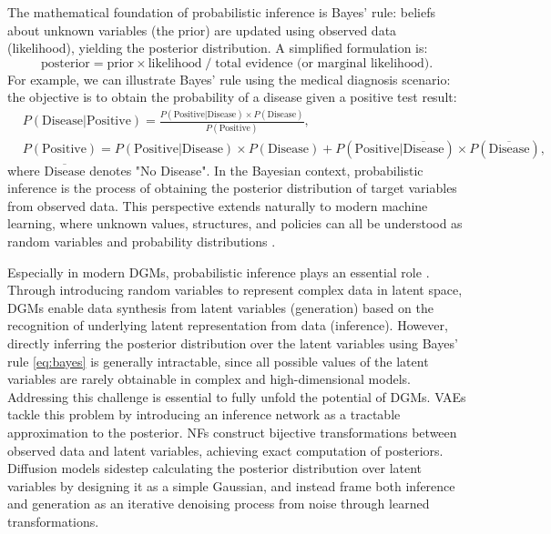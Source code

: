 The mathematical foundation of probabilistic inference is Bayes' rule: beliefs about unknown variables (the prior) are updated using observed data (likelihood), yielding the posterior distribution. A simplified formulation is:
\begin{equation*}
    \label{eq:bayes_sim}
    \text{posterior} = \text{prior}\times \text{likelihood} \;/\; \text{total evidence (or marginal likelihood)}.
\end{equation*}
For example, we can illustrate Bayes' rule using the medical diagnosis scenario: the objective is to obtain the probability of a disease given a positive test result:
\begin{align*}
& P(\text{Disease} | \text{Positive}) = \frac{P(\text{Positive} | \text{Disease}) \times P(\text{Disease})}{P(\text{Positive})},\\
& P(\text{Positive}) = P(\text{Positive} | \text{Disease}) \times P(\text{Disease}) + P(\text{Positive} | \overline{\text{Disease}}) \times P(\overline{\text{Disease}}),
\end{align*}
where $\overline{\text{Disease}}$ denotes "No Disease".
In the Bayesian context, probabilistic inference is the process of obtaining the posterior distribution of target variables from observed data. This perspective extends naturally to modern machine learning, where unknown values, structures, and policies can all be understood as random variables and probability distributions \citep{pml1Book}.

Especially in modern \acfp{DGM}, probabilistic inference plays an essential role \citep{pml2Book}. Through introducing random variables to represent complex data in latent space, \acp{DGM} enable data synthesis from latent variables (generation) based on the recognition of underlying latent representation from data (inference). However, directly inferring the posterior distribution over the latent variables using Bayes' rule \ref{eq:bayes} is generally intractable, since all possible values of the latent variables are rarely obtainable in complex and high-dimensional models. Addressing this challenge is essential to fully unfold the potential of \acp{DGM}. \acfp{VAE} \citep{Kingma_2019} tackle this problem by introducing an inference network as a tractable approximation to the posterior. \acfp{NF} \citep{rezende2016} construct bijective transformations between observed data and latent variables, achieving exact computation of posteriors. Diffusion models \citep{ho2020ddpm} sidestep calculating the posterior distribution over latent variables by designing it as a simple Gaussian, and instead frame both inference and generation as an iterative denoising process from noise through learned transformations.

